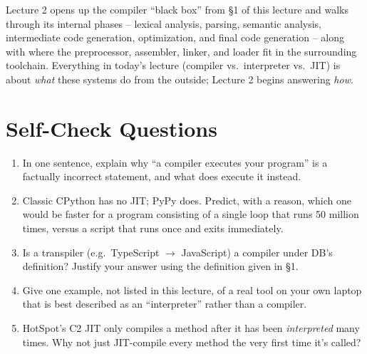 \documentclass[11pt]{article}
\begin{document}
Lecture 2 opens up the compiler ``black box'' from \S1 of this lecture and walks through its
internal phases -- lexical analysis, parsing, semantic analysis, intermediate code generation,
optimization, and final code generation -- along with where the preprocessor, assembler, linker,
and loader fit in the surrounding toolchain. Everything in today's lecture (compiler vs.\
interpreter vs.\ JIT) is about \emph{what} these systems do from the outside; Lecture 2 begins
answering \emph{how}.

\section{Self-Check Questions}

\begin{enrichment}
\begin{enumerate}
  \item In one sentence, explain why ``a compiler executes your program'' is a factually
  incorrect statement, and what does execute it instead.
  \item Classic CPython has no JIT; PyPy does. Predict, with a reason, which one would be faster
  for a program consisting of a single loop that runs 50 million times, versus a script that
  runs once and exits immediately.
  \item Is a transpiler (e.g.\ TypeScript $\to$ JavaScript) a compiler under DB's definition?
  Justify your answer using the definition given in \S1.
  \item Give one example, not listed in this lecture, of a real tool on your own laptop that is
  best described as an ``interpreter'' rather than a compiler.
  \item HotSpot's C2 JIT only compiles a method after it has been \emph{interpreted} many
  times. Why not just JIT-compile every method the very first time it's called?
\end{enumerate}
\end{enrichment}
\end{document}

